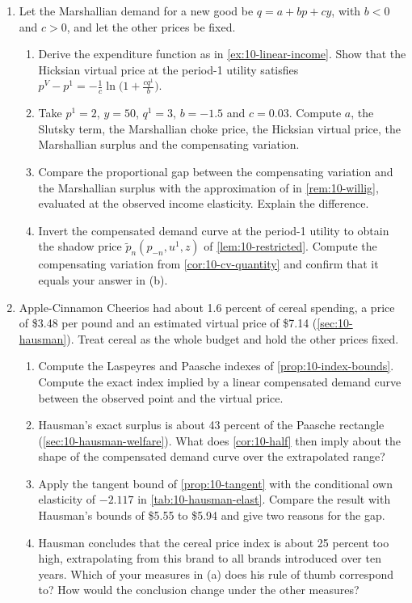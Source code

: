 \begin{enumerate}[label=\arabic*., leftmargin=*, itemsep=6pt]

\item Let the Marshallian demand for a new good be $q = a + bp + cy$, with $b < 0$ and $c > 0$, and let the other
prices be fixed.
\begin{enumerate}[label=(\alph*)]
  \item Derive the expenditure function as in \cref{ex:10-linear-income}. Show that the Hicksian virtual price at
  the period-1 utility satisfies $p^V - p^1 = -\frac{1}{c}\ln\bigl(1 + \frac{cq^1}{b}\bigr)$.
  \item Take $p^1 = 2$, $y = 50$, $q^1 = 3$, $b = -1.5$ and $c = 0.03$. Compute $a$, the Slutsky term, the
  Marshallian choke price, the Hicksian virtual price, the Marshallian surplus and the compensating variation.
  \item Compare the proportional gap between the compensating variation and the Marshallian surplus with the
  approximation of \citet{Willig1976} in \cref{rem:10-willig}, evaluated at the observed income elasticity.
  Explain the difference.
  \item Invert the compensated demand curve at the period-1 utility to obtain the shadow price
  $\tilde p_n(p_{-n},u^1,z)$ of \cref{lem:10-restricted}. Compute the compensating variation from
  \cref{cor:10-cv-quantity} and confirm that it equals your answer in (b).
\end{enumerate}

\item Apple-Cinnamon Cheerios had about 1.6 percent of cereal spending, a price of \$3.48 per pound and an
estimated virtual price of \$7.14 (\cref{sec:10-hausman}). Treat cereal as the whole budget and hold the other
prices fixed.
\begin{enumerate}[label=(\alph*)]
  \item Compute the Laspeyres and Paasche indexes of \cref{prop:10-index-bounds}. Compute the exact index implied by
  a linear compensated demand curve between the observed point and the virtual price.
  \item Hausman's exact surplus is about 43 percent of the Paasche rectangle (\cref{sec:10-hausman-welfare}). What
  does \cref{cor:10-half} then imply about the shape of the compensated demand curve over the extrapolated range?
  \item Apply the tangent bound of \cref{prop:10-tangent} with the conditional own elasticity of $-2.117$ in
  \cref{tab:10-hausman-elast}. Compare the result with Hausman's bounds of \$5.55 to \$5.94 and give two reasons for
  the gap.
  \item Hausman concludes that the cereal price index is about 25 percent too high, extrapolating from this brand to
  all brands introduced over ten years. Which of your measures in (a) does his rule of thumb correspond to? How
  would the conclusion change under the other measures?
\end{enumerate}


\end{enumerate}
